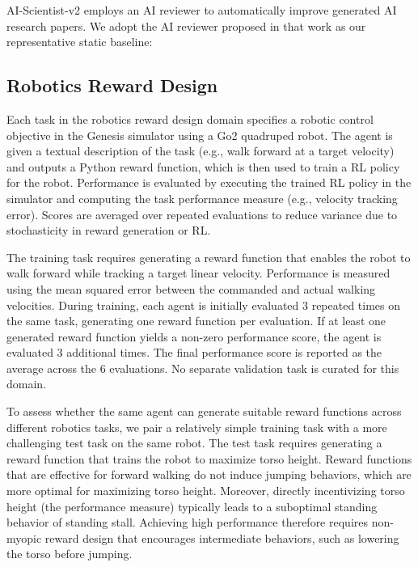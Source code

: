 \documentclass[]{fairmeta}
\begin{document}
AI-Scientist-v2 \citep{yamada2025ai} employs an AI reviewer to automatically improve generated AI research papers. We adopt the AI reviewer proposed in that work as our representative static baseline:


\subsection{Robotics Reward Design}
\label{app:domain-genesis}

Each task in the robotics reward design domain specifies a robotic control objective in the Genesis simulator \citep{genesis2024} using a Go2 quadruped robot. The agent is given a textual description of the task (e.g., walk forward at a target velocity) and outputs a Python reward function, which is then used to train a RL policy \citep[i.e., PPO,][]{schulman2017proximal} for the robot. Performance is evaluated by executing the trained RL policy in the simulator and computing the task performance measure (e.g., velocity tracking error). Scores are averaged over repeated evaluations to reduce variance due to stochasticity in reward generation or RL.

The training task requires generating a reward function that enables the robot to walk forward while tracking a target linear velocity. Performance is measured using the mean squared error between the commanded and actual walking velocities. During training, each agent is initially evaluated 3 repeated times on the same task, generating one reward function per evaluation. If at least one generated reward function yields a non-zero performance score, the agent is evaluated 3 additional times. The final performance score is reported as the average across the 6 evaluations. No separate validation task is curated for this domain.

To assess whether the same agent can generate suitable reward functions across different robotics tasks, we pair a relatively simple training task with a more challenging test task on the same robot. The test task requires generating a reward function that trains the robot to maximize torso height. Reward functions that are effective for forward walking do not induce jumping behaviors, which are more optimal for maximizing torso height. Moreover, directly incentivizing torso height (the performance measure) typically leads to a suboptimal standing behavior of standing stall. Achieving high performance therefore requires non-myopic reward design that encourages intermediate behaviors, such as lowering the torso before jumping.
\end{document}
